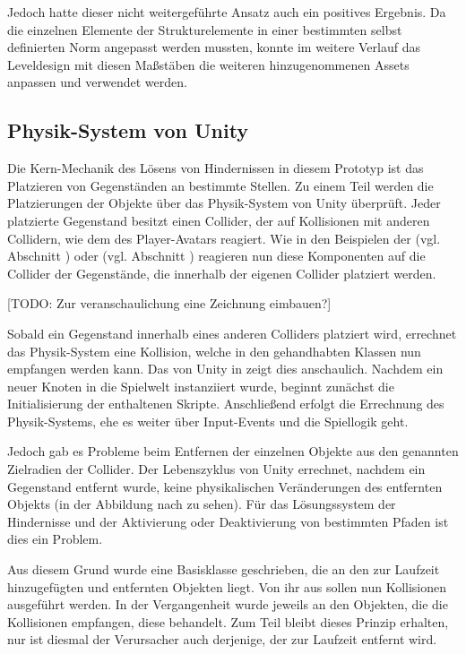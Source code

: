 Jedoch hatte dieser nicht weitergeführte Ansatz auch ein positives Ergebnis. Da die einzelnen Elemente der Strukturelemente in einer bestimmten selbst definierten Norm angepasst werden mussten, konnte im weitere Verlauf das Leveldesign mit diesen Maßstäben die weiteren hinzugenommenen Assets anpassen und verwendet werden.

\subsection{Physik-System von Unity}\label{sec:unity-physics-system}
Die Kern-Mechanik des Lösens von Hindernissen in diesem Prototyp ist das Platzieren von Gegenständen an bestimmte Stellen. Zu einem Teil werden die Platzierungen der Objekte über das Physik-System von Unity überprüft. Jeder platzierte Gegenstand besitzt einen Collider, der auf Kollisionen mit anderen Collidern, wie dem des Player-Avatars reagiert. Wie in den Beispielen der  (vgl. Abschnitt ) oder  (vgl. Abschnitt ) reagieren nun diese Komponenten auf die Collider der Gegenstände, die innerhalb der eigenen Collider platziert werden. 

[TODO: Zur veranschaulichung eine Zeichnung eimbauen?]

Sobald ein Gegenstand innerhalb eines anderen Colliders platziert wird, errechnet das Physik-System eine Kollision, welche in den gehandhabten Klassen nun empfangen werden kann. Das  von Unity in \cite{technologies_unity_nodate} zeigt dies anschaulich. Nachdem ein neuer Knoten in die Spielwelt instanziiert wurde, beginnt zunächst die Initialisierung der enthaltenen Skripte. Anschließend erfolgt die Errechnung des Physik-Systems, ehe es weiter über Input-Events und die Spiellogik geht.

Jedoch gab es Probleme beim Entfernen der einzelnen Objekte aus den genannten Zielradien der Collider. Der Lebenszyklus von Unity errechnet, nachdem ein Gegenstand entfernt wurde, keine physikalischen Veränderungen des entfernten Objekts (in der Abbildung nach  zu sehen). Für das Lösungssystem der Hindernisse und der Aktivierung oder Deaktivierung von bestimmten Pfaden ist dies ein Problem.

Aus diesem Grund wurde eine Basisklasse geschrieben, die an den zur Laufzeit hinzugefügten und entfernten Objekten liegt. Von ihr aus sollen nun Kollisionen ausgeführt werden. In der Vergangenheit wurde jeweils an den Objekten, die die Kollisionen empfangen, diese behandelt. Zum Teil bleibt dieses Prinzip erhalten, nur ist diesmal der Verursacher auch derjenige, der zur Laufzeit entfernt wird.

